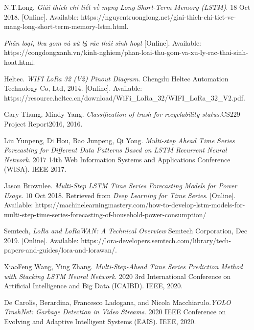 \documentclass{Classes/UITBA}
\begin{document}
\begin{thebibliography}{SJL05}

 N.T.Long. \textit{Giải thích chi tiết về mạng Long Short-Term Memory (LSTM)}. 18 Oct 2018. [Online]. Available: https://nguyentruonglong.net/giai-thich-chi-tiet-ve-mang-long-short-term-memory-lstm.html.

 \textit{Phân loại, thu gom và xử lý rác thải sinh hoạt} [Online]. Available: https://congdongxanh.vn/kinh-nghiem/phan-loai-thu-gom-va-xu-ly-rac-thai-sinh-hoat.html.

 Heltec. \textit{WIFI LoRa 32 (V2) Pinout Diagram}. Chengdu Heltec Automation Technology Co, Ltd, 2014. [Online]. Available: https://resource.heltec.cn/download/WiFi\_LoRa\_32/WIFI\_LoRa\_32\_V2.pdf.

 Gary Thung, Mindy Yang. \textit{Classification of trash for recyclability status}.CS229 Project Report2016, 2016.

 Liu Yunpeng, Di Hou, Bao Junpeng, Qi Yong. \textit{Multi-step Ahead Time Series Forecasting for Different Data Patterns Based on LSTM Recurrent Neural Network}. 2017 14th Web Information Systems and Applications Conference (WISA). IEEE 2017.

 Jason Brownlee. \textit{Multi-Step LSTM Time Series Forecasting Models for Power Usage}. 10 Oct 2018. Retrieved from \textit{Deep Learning for Time Series}. [Online]. Available: https://machinelearningmastery.com/how-to-develop-lstm-models-for-multi-step-time-series-forecasting-of-household-power-consumption/

 Semtech, \textit{LoRa and LoRaWAN: A Technical Overview} Semtech Corporation, Dec 2019. [Online]. Available: https://lora-developers.semtech.com/library/tech-papers-and-guides/lora-and-lorawan/.

 XiaoFeng Wang, Ying Zhang. \textit{Multi-Step-Ahead Time Series Prediction Method with Stacking LSTM Neural Network}. 2020 3rd International Conference on Artificial Intelligence and Big Data (ICAIBD). IEEE, 2020.

 De Carolis, Berardina, Francesco Ladogana, and Nicola Macchiarulo.\textit{YOLO TrashNet: Garbage Detection in Video Streams.} 2020 IEEE Conference on Evolving and Adaptive Intelligent Systems (EAIS). IEEE, 2020.


\end{thebibliography}
\end{document}
